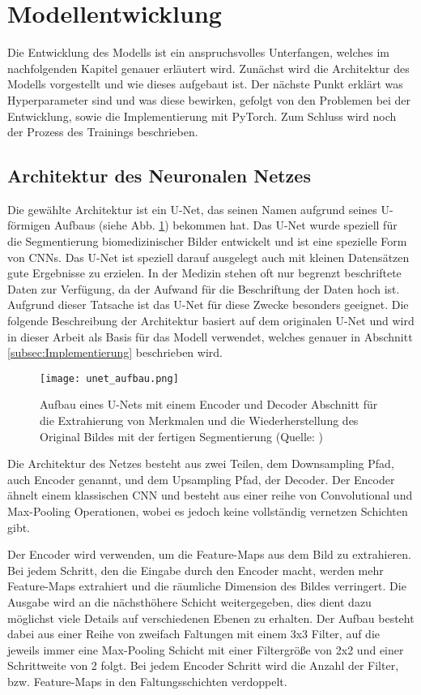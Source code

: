 \section{Modellentwicklung}
Die Entwicklung des \gls{Modell}s ist ein anspruchsvolles Unterfangen, welches im nachfolgenden Kapitel genauer erläutert wird. Zunächst wird die Architektur des \gls{Modell}s vorgestellt und wie dieses aufgebaut ist. Der nächste Punkt erklärt was Hyperparameter sind und was diese bewirken, gefolgt von den Problemen bei der Entwicklung, sowie die Implementierung mit PyTorch. Zum Schluss wird noch der Prozess des Trainings beschrieben.
\subsection{Architektur des Neuronalen Netzes}
\label{sec:Modellarchitektur}
Die gewählte Architektur ist ein U-Net, das seinen Namen aufgrund seines U-förmigen Aufbaus (siehe Abb. \ref{fig:unet_aufbau}) bekommen hat. Das U-Net wurde speziell für die Segmentierung biomedizinischer Bilder entwickelt und ist eine spezielle Form von \ac{CNN}s. Das U-Net ist speziell darauf ausgelegt auch mit kleinen Datensätzen gute Ergebnisse zu erzielen. In der Medizin stehen oft nur begrenzt beschriftete Daten zur Verfügung, da der Aufwand für die Beschriftung der Daten hoch ist. Aufgrund dieser Tatsache ist das U-Net für diese Zwecke besonders geeignet. Die folgende Beschreibung der Architektur basiert auf dem originalen U-Net und wird in dieser Arbeit als Basis für das \gls{Modell} verwendet, welches genauer in Abschnitt \ref{subsec:Implementierung} beschrieben wird.

\begin{figure}
	\centering
	\texttt{[image: unet\_aufbau.png]}
	\caption{Aufbau eines U-Nets mit einem Encoder und Decoder Abschnitt für die Extrahierung von Merkmalen und die Wiederherstellung des Original Bildes mit der fertigen Segmentierung (Quelle: \cite{Ronneberger2015})}
	\label{fig:unet_aufbau}
\end{figure}
Die Architektur des Netzes besteht aus zwei Teilen, dem Downsampling Pfad, auch Encoder genannt, und dem Upsampling Pfad, der Decoder. Der Encoder ähnelt einem klassischen \ac{CNN} und besteht aus einer reihe von Convolutional und Max-Pooling Operationen, wobei es jedoch keine vollständig vernetzen Schichten gibt. 

Der Encoder wird verwenden, um die Feature-Maps aus dem Bild zu extrahieren. Bei jedem Schritt, den die Eingabe durch den Encoder macht, werden mehr Feature-Maps extrahiert und die räumliche Dimension des Bildes verringert. Die Ausgabe wird an die nächsthöhere Schicht weitergegeben, dies dient dazu möglichst viele Details auf verschiedenen Ebenen zu erhalten. Der Aufbau besteht dabei aus einer Reihe von zweifach Faltungen mit einem 3x3 Filter, auf die jeweils immer eine Max-Pooling Schicht mit einer Filtergröße von 2x2 und einer Schrittweite von 2 folgt. Bei jedem Encoder Schritt wird die Anzahl der Filter, bzw. Feature-Maps in den Faltungsschichten verdoppelt.

